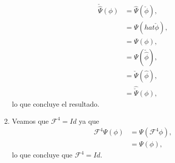 \begin{homeworkProblem}
\begin{solution}
\begin{enumerate}
\begin{align*}
          \check{\hat{\Psi}}(\phi)&=\hat{\Psi}(\check{\phi}),\\
          &=\Psi(hat{\check{\phi}}),\\
          &=\Psi(\phi),\\
          &=\Psi(\check{\hat{\phi}}),\\
          &=\check{\Psi}(\hat{\phi}),\\
          &=\hat{\check{\Psi}}(\phi),
        \end{align*}
        lo que concluye el resultado.
      \item Veamos que $\mathcal{F}^{4}=Id$ ya que
        \begin{align*}
          \mathcal{F}^{4}\Psi(\phi)&=\Psi(\mathcal{F}^{4}\phi),\\
          &=\Psi(\phi),
        \end{align*}
        lo que concluye que $\mathcal{F}^{4}=Id$.
    \end{enumerate}
  \end{solution}
\end{homeworkProblem}
